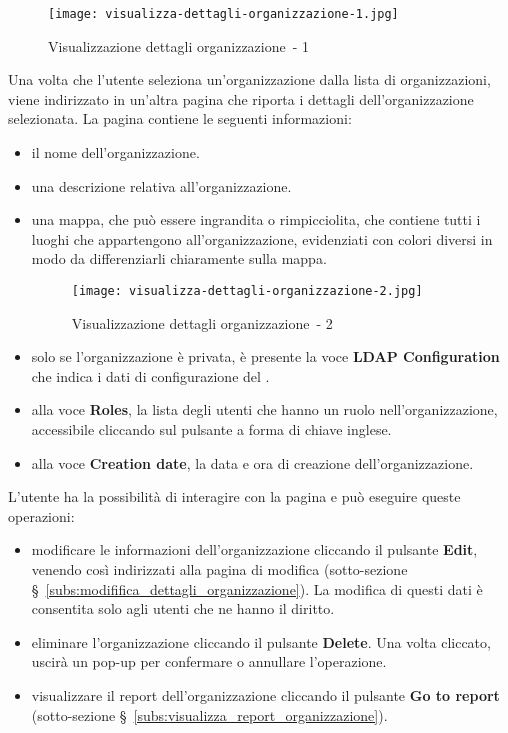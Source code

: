 \documentclass[../manuale-utente.tex]{subfiles}
\begin{document}
\begin{figure}[H]
    \centering
    \texttt{[image: visualizza-dettagli-organizzazione-1.jpg]}
    \caption{Visualizzazione dettagli organizzazione~- 1}%
    \label{fig:web_app_visualizzazione_dettagli_organizzazione-1}
\end{figure}
Una volta che l'utente seleziona un'organizzazione dalla lista di organizzazioni, viene indirizzato in un'altra pagina che riporta i dettagli dell'organizzazione selezionata.
La pagina contiene le seguenti informazioni:
\begin{itemize}
  \item il nome dell'organizzazione.
  \item una descrizione relativa all'organizzazione.
  \item una mappa, che può essere ingrandita o rimpicciolita, che contiene tutti i luoghi che appartengono all'organizzazione, evidenziati con colori diversi in modo da differenziarli chiaramente sulla mappa.
  \begin{figure}[H]
    \centering
    \texttt{[image: visualizza-dettagli-organizzazione-2.jpg]}
    \caption{Visualizzazione dettagli organizzazione~- 2}%
    \label{fig:web_app_visualizzazione_dettagli_organizzazione-2}
  \end{figure}
  \item solo se l'organizzazione è privata, è presente la voce \textbf{LDAP Configuration} che indica i dati di configurazione del .
  \item alla voce \textbf{Roles}, la lista degli utenti che hanno un ruolo nell'organizzazione, accessibile cliccando sul pulsante a forma di chiave inglese. %
  \item alla voce \textbf{Creation date}, la data e ora di creazione dell'organizzazione.
\end{itemize}
L'utente ha la possibilità di interagire con la pagina e può eseguire queste operazioni:
\begin{itemize}
  \item modificare le informazioni dell'organizzazione cliccando il pulsante \textbf{Edit}, venendo così indirizzati alla pagina di modifica (sotto-sezione §~\ref{subs:modififica_dettagli_organizzazione}). La modifica di questi dati è consentita solo agli utenti che ne hanno il diritto.
  \item eliminare l'organizzazione cliccando il pulsante \textbf{Delete}. Una volta cliccato, uscirà un pop-up per confermare o annullare l'operazione.
  \item visualizzare il report dell'organizzazione cliccando il pulsante \textbf{Go to report} (sotto-sezione §~\ref{subs:visualizza_report_organizzazione}).
\end{itemize}
\end{document}
